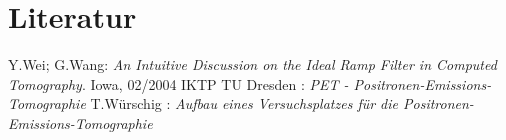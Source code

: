 \section{Literatur}

\begin{thebibliography}{99}
 Y.Wei; G.Wang: \textit{An Intuitive Discussion on the Ideal Ramp Filter in Computed Tomography}. Iowa, 02/2004 
 IKTP TU Dresden : \textit{PET - Positronen-Emissions-Tomographie}
 T.Würschig :  \textit{Aufbau eines Versuchsplatzes für die Positronen-Emissions-Tomographie}

\end{thebibliography}